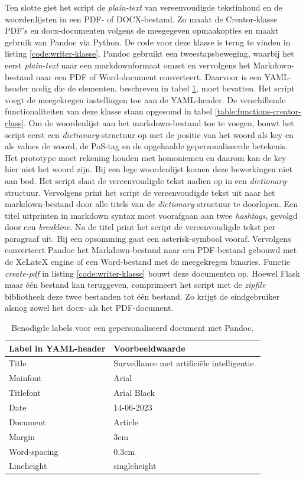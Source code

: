 Ten slotte giet het script de \textit{plain-text} van vereenvoudigde tekstinhoud en de woordenlijsten in een PDF- of DOCX-bestand. Zo maakt de Creator-klasse PDF's en docx-documenten volgens de meegegeven opmaakopties en maakt gebruik van Pandoc via Python. De code voor deze klasse is terug te vinden in listing \ref{code:writer-klasse}. Pandoc gebruikt een tweestapsbeweging, waarbij het eerst \textit{plain-text} naar een markdownformaat omzet en vervolgens het Markdown-bestand naar een PDF of Word-document converteert. Daarvoor is een YAML-header nodig die de elementen, beschreven in tabel \ref{table:personalized-pdf-word-document-with-pandoc}, moet bevatten. Het script voegt de meegekregen instellingen toe aan de YAML-header. De verschillende functionaliteiten van deze klasse staan opgesomd in tabel \ref{table:functions-creator-class}. Om de woordenlijst aan het markdown-bestand toe te voegen, bouwt het script eerst een \textit{dictionary}-structuur op met de positie van het woord als key en als values de woord, de PoS-tag en de opgehaalde gepersonaliseerde betekenis. Het prototype moet rekening houden met homoniemen en daarom kan de key hier niet het woord zijn. Bij een lege woordenlijst komen deze bewerkingen niet aan bod. Het script slaat de vereenvoudigde tekst nadien op in een \textit{dictionary}-structuur. Vervolgens print het script de vereenvoudigde tekst uit naar het markdown-bestand door alle titels van de \textit{dictionary}-structuur te doorlopen. Een titel uitprinten in markdown syntax moet voorafgaan aan twee \textit{hashtags}, gevolgd door een \textit{breakline}. Na de titel print het script de vereenvoudigde tekst per paragraaf uit. Bij een opsomming gaat een asterisk-symbool vooraf. Vervolgens converteert Pandoc het Markdown-bestand naar een PDF-bestand gebouwd met de XeLateX engine of een Word-bestand met de meegekregen binaries. Functie \textit{create-pdf} in listing \ref{code:writer-klasse} bouwt deze documenten op. Hoewel Flask maar één bestand kan teruggeven, comprimeert het script met de \textit{zipfile} bibliotheek deze twee bestanden tot één bestand. Zo krijgt de eindgebruiker alsnog zowel het docx- als het PDF-document. 

\begin{table}[H]
	\begin{tabular}{ | m{5cm}| m{5cm} | }
		\hline
		\textbf{Label in YAML-header} & \textbf{Voorbeeldwaarde} \\ \hline
		Title & Surveillance met artificiële intelligentie. \\ \hline
		Mainfont & Arial \\ \hline 
		Titlefont & Arial Black \\ \hline
		Date & 14-06-2023 \\ \hline 
		Document & Article \\ \hline
		Margin & 3cm \\ \hline
		Word-spacing & 0.3cm \\ \hline 
		Lineheight & singleheight \\ \hline
	\end{tabular}
	\caption{Benodigde labels voor een gepersonaliseerd document met Pandoc.}
	\label{table:personalized-pdf-word-document-with-pandoc}
\end{table}

